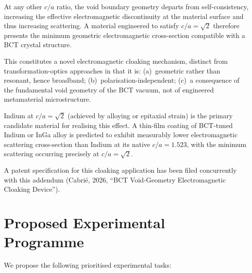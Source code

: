 \documentclass[aps,prl,twocolumn,superscriptaddress,floatfix]{revtex4-2}
\begin{document}
At any other $c/a$ ratio, the void boundary geometry departs from
self-consistency, increasing the effective electromagnetic
discontinuity at the material surface and thus increasing scattering.
A material engineered to satisfy $c/a = \sqrt{2}$ therefore presents
the minimum geometric electromagnetic cross-section compatible with
a BCT crystal structure.

This constitutes a novel electromagnetic cloaking mechanism, distinct
from transformation-optics approaches in that it is:
(a)~geometric rather than resonant, hence broadband;
(b)~polarisation-independent;
(c)~a consequence of the fundamental void geometry of the BCT vacuum,
not of engineered metamaterial microstructure.

Indium at $c/a = \sqrt{2}$ (achieved by alloying or epitaxial strain)
is the primary candidate material for realising this effect.
A thin-film coating of BCT-tuned Indium or InGa alloy is predicted
to exhibit measurably lower electromagnetic scattering cross-section
than Indium at its native $c/a = 1.523$, with the minimum scattering
occurring precisely at $c/a = \sqrt{2}$.

A patent specification for this cloaking application has been filed
concurrently with this addendum (Cabri\'{e}, 2026,
``BCT Void-Geometry Electromagnetic Cloaking Device'').

\section{Proposed Experimental Programme}

We propose the following prioritised experimental tasks:
\end{document}
